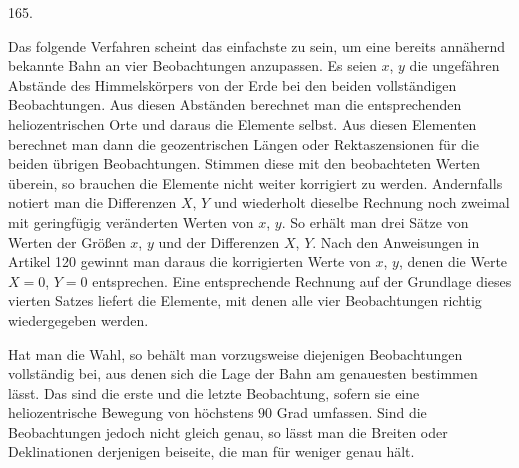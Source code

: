 \begin{center}\hypertarget{native-228-article165}{}165.\end{center}
Das folgende Verfahren scheint das einfachste zu sein, um eine bereits annähernd bekannte Bahn an vier Beobachtungen anzupassen. Es seien $x$, $y$ die ungefähren Abstände des Himmelskörpers von der Erde bei den beiden vollständigen Beobachtungen. Aus diesen Abständen berechnet man die entsprechenden heliozentrischen Orte und daraus die Elemente selbst. Aus diesen Elementen berechnet man dann die geozentrischen Längen oder Rektaszensionen für die beiden übrigen Beobachtungen. Stimmen diese mit den beobachteten Werten überein, so brauchen die Elemente nicht weiter korrigiert zu werden. Andernfalls notiert man die Differenzen $X$, $Y$ und wiederholt dieselbe Rechnung noch zweimal mit geringfügig veränderten Werten von $x$, $y$. So erhält man drei Sätze von Werten der Größen $x$, $y$ und der Differenzen $X$, $Y$. Nach den Anweisungen in Artikel 120 gewinnt man daraus die korrigierten Werte von $x$, $y$, denen die Werte $X=0$, $Y=0$ entsprechen. Eine entsprechende Rechnung auf der Grundlage dieses vierten Satzes liefert die Elemente, mit denen alle vier Beobachtungen richtig wiedergegeben werden.

Hat man die Wahl, so behält man vorzugsweise diejenigen Beobachtungen vollständig bei, aus denen sich die Lage der Bahn am genauesten bestimmen lässt. Das sind die erste und die letzte Beobachtung, sofern sie eine heliozentrische Bewegung von höchstens $90$ Grad umfassen. Sind die Beobachtungen jedoch nicht gleich genau, so lässt man die Breiten oder Deklinationen derjenigen beiseite, die man für weniger genau hält.
